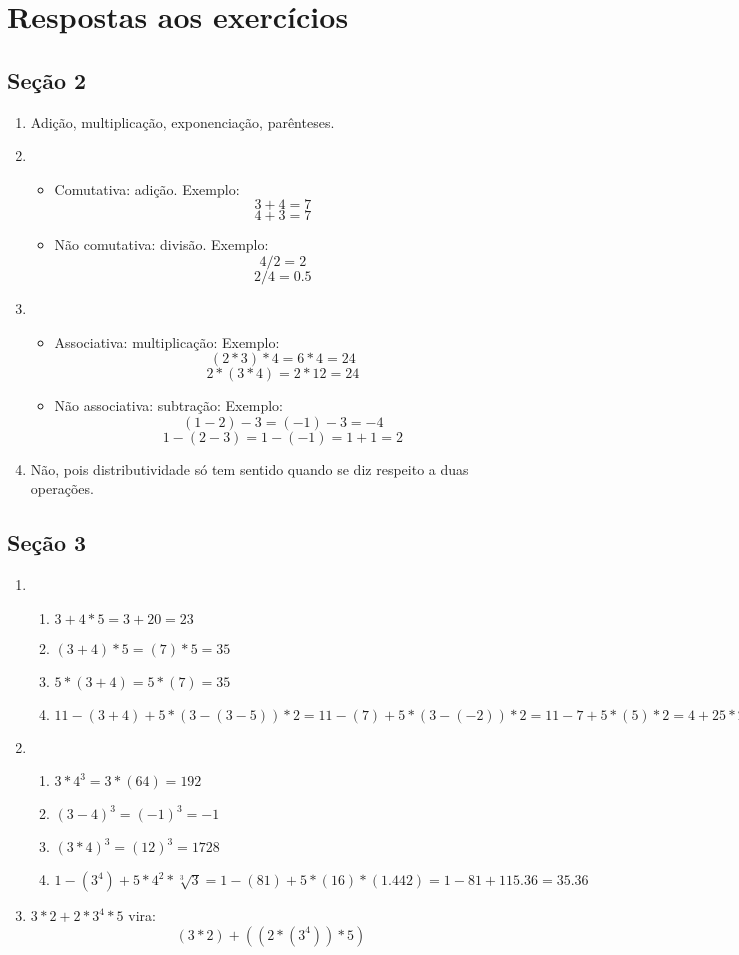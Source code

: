 \documentclass[12pt]{article}
\begin{document}
\newpage

\section{Respostas aos exercícios}
\subsection{Seção 2}
\begin{enumerate}
	\item Adição, multiplicação, exponenciação, parênteses.
	\item 
	\begin{itemize}
		\item Comutativa: adição. Exemplo:
$$3 + 4 = 7$$
$$4 + 3 = 7$$
		\item Não comutativa: divisão. Exemplo:
$$4 / 2 = 2$$
$$2 / 4 = 0.5$$
	\end{itemize}
	\item 
	\begin{itemize}
		\item Associativa: multiplicação: Exemplo:
$$(2 * 3) * 4 = 6*4 = 24$$
$$2 * (3 * 4) = 2*12 = 24$$
		\item Não associativa: subtração: Exemplo:
$$(1 - 2) - 3 = (-1) - 3 = -4$$
$$1 - (2 - 3) = 1 - (-1) = 1 + 1 = 2$$
	\end{itemize}
	\item Não, pois distributividade só tem sentido quando se diz respeito a
duas operações.
\end{enumerate}

\subsection{Seção 3}
\begin{enumerate}
	\item 
	\begin{enumerate}
		\item $3 + 4*5 = 3 + 20 = 23$
		\item $(3 + 4)*5 = (7)*5 = 35$
		\item $5*(3 + 4) = 5*(7) = 35$
		\item $11 - (3 + 4) + 5*(3 - (3 - 5))*2 = 11 - (7) + 5*(3 - (-2))*2 =
11 - 7 + 5*(5)*2 = 4 + 25*2 = 54$
	\end{enumerate}
	\item 
	\begin{enumerate}
		\item $3 * 4^3 = 3*(64) = 192$
		\item ${(3 - 4)}^3 = {(-1)}^3 = -1$
		\item ${(3 * 4)}^3 = {(12)}^3 = 1728$
		\item $1 - (3^4) + 5*4^2*\sqrt[3]{3} = 1 - (81) + 5*(16)*(1.442) =
1 - 81 + 115.36 = 35.36$
	\end{enumerate}
	\item $3*2 + 2*3^4*5$ vira:
$$(3*2) + ((2*(3^4))*5)$$
\end{enumerate}
\end{document}
